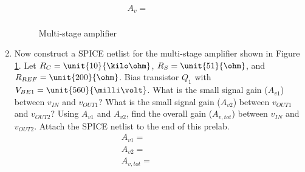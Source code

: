 \documentclass{article}
\begin{document}
\begin{enumerate}
	\begin{align*}
    		\boxed{A_v = ~~~~~~~~~~~~~~~~~~~~~~~~ } \\
  	\end{align*}

	\begin{figure}[!htb]
		
		\centerline{\box\graph}
		\caption{Multi-stage amplifier}
		\label{multi}
	\end{figure}

	\item Now construct a SPICE netlist for the multi-stage amplifier shown in Figure \ref{multi}. Let $R_C = \unit{10}{\kilo\ohm}$, $R_S = \unit{51}{\ohm}$, and $R_{REF} = \unit{200}{\ohm}$. Bias transistor $Q_1$ with $V_{BE1} = \unit{560}{\milli\volt}$. What is the small signal gain ($A_{v1}$) between $v_{IN}$ and $v_{OUT1}$? What is the small signal gain ($A_{v2}$) between $v_{OUT1}$ and $v_{OUT2}$? Using $A_{v1}$ and $A_{v2}$, find the overall gain ($A_{v,tot}$) between $v_{IN}$ and $v_{OUT2}$. Attach the SPICE netlist to the end of this prelab. \\

	\begin{align*}
    		\boxed{A_{v1} = ~~~~~~~~~~~~~~~~~~~~~~~~~ } \\
		\boxed{A_{v2} = ~~~~~~~~~~~~~~~~~~~~~~~~~ } \\
		\boxed{A_{v,tot} = ~~~~~~~~~~~~~~~~~~~~~~~~~} \\
  	\end{align*}

\end{enumerate}
\end{document}
